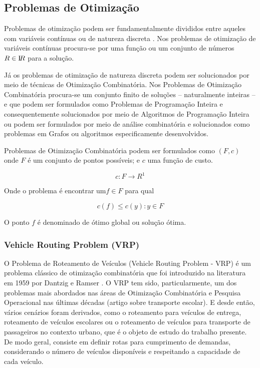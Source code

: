\subsection{Problemas de Otimização}\label{problemas-de-otimizacao}

Problemas de otimização podem ser fundamentalmente divididos entre aqueles com variáveis contínuas ou de natureza discreta \cite{combinatorial-optimization}. Nos problemas de otimização de variáveis contínuas procura-se por uma função ou um conjunto de números \(R \in \textrm I\!R \) para a solução.

Já os problemas de otimização de natureza discreta podem ser solucionados por meio de técnicas de Otimização Combinatória. Nos Problemas de Otimização Combinatória procura-se um conjunto finito de soluções -- naturalmente inteiras -- e que podem ser formulados como Problemas de Programação Inteira e consequentemente solucionados por meio de Algoritmos de Programação Inteira \cite{goldbarg} ou podem ser formulados por meio de análise combinatória e solucionados como problemas em Grafos ou algoritmos especificamente desenvolvidos.


Problemas de Otimização Combinatória podem ser formulados como \((F, c)\) onde \(F\) é um conjunto de pontos possíveis; e \(c\) uma função de custo. \cite{rodolfo}

\[c: F \longrightarrow R^1 \]

Onde o problema é encontrar um\(f \in F\) para qual

\[c(f) \leq c(y): y \in F \]

O ponto \(f\) é denominado de ótimo global ou solução ótima.

\subsubsection{Vehicle Routing Problem (VRP)} \label{vrp}

O Problema de Roteamento de Veículos (Vehicle Routing Problem - VRP) é um problema clássico de otimização combinatória que foi introduzido na literatura em 1959 por Dantzig e Ramser \cite{toth}. O VRP tem sido, particularmente, um dos problemas mais abordados nas áreas de Otimização Combinatória e Pesquisa Operacional nas últimas décadas (artigo sobre transporte escolar). E desde então, vários cenários foram derivados, como o roteamento para veículos de entrega, roteamento de veículos escolares ou o roteamento de veículos para transporte de passageiros no contexto urbano, que é o objeto de estudo do trabalho presente. De modo geral, consiste em definir rotas para cumprimento de demandas, considerando o número de veículos disponíveis e respeitando a capacidade de cada veículo.

